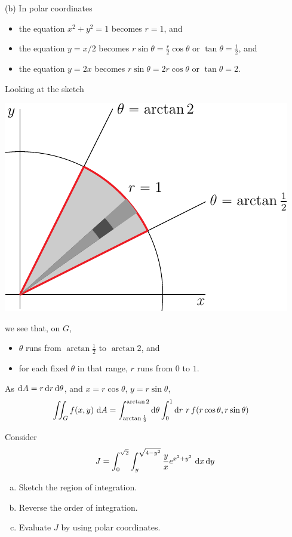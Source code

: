 \begin{solution}
(b) In polar coordinates
\begin{itemize}
\item
the equation $x^2+y^2=1$ becomes $r=1$, and
\item
the equation $y=x/2$ becomes $r\sin\theta = \frac{r}{2}\cos\theta$
or $\tan\theta =\frac{1}{2}$, and
\item
the equation $y=2x$ becomes $r\sin\theta = 2r\cos\theta$
or $\tan\theta =2$.
\end{itemize}
Looking at the sketch
\begin{center}
     \includegraphics{fig/OE10A_5p.pdf}
\end{center}
we see that, on $G$,
\begin{itemize}
\item
$\theta$ runs from $\arctan\frac{1}{2}$ to $\arctan 2$, and
\item
for each fixed $\theta$ in that range, $r$ runs from $0$  to $1$.
\end{itemize}
As $\mathrm{d}A=r\,\mathrm{d}r\,\mathrm{d}\theta$, and $x=r\cos\theta$, $y=r\sin\theta$,
\begin{align*}
\iint_G f(x,y)\ \mathrm{d}A
&=\int_{\arctan\frac{1}{2}}^{\arctan 2}\mathrm{d}\theta
       \int_0^1\mathrm{d}r\ r\,f(r\cos\theta,r\sin\theta)
\end{align*}

\end{solution}


\begin{question}[M200 2011A] %
Consider
\begin{equation*}
J = \int_0^{\sqrt{2}}  \int_y^{\sqrt{4-y^2}}  \frac{y}{x}  e^{x^2+y^2}\
                                            \mathrm{d}x\,\mathrm{d}y
\end{equation*}
\begin{enumerate}[(a)]
\item 
Sketch the region of integration.
\item
Reverse the order of integration.
\item
Evaluate $J$ by using polar coordinates.
\end{enumerate}
\end{question}

